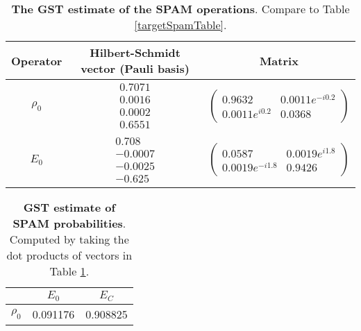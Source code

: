 {\begin{table}[h]
\begin{center}
\begin{tabular}[l]{|c|c|c|}
\hline
Operator & Hilbert-Schmidt vector (Pauli basis) & Matrix \\ \hline
$\rho_{0}$ & $ \begin{array}{c}
0.7071 \\ 
0.0016 \\ 
0.0002 \\ 
0.6551
 \end{array} $
 & $ \left(\!\!\begin{array}{cc}
0.9632 & 0.0011e^{-i0.2} \\ 
0.0011e^{i0.2} & 0.0368
 \end{array}\!\!\right) $
 \\ \hline
$E_{0}$ & $ \begin{array}{c}
0.708 \\ 
-0.0007 \\ 
-0.0025 \\ 
-0.625
 \end{array} $
 & $ \left(\!\!\begin{array}{cc}
0.0587 & 0.0019e^{i1.8} \\ 
0.0019e^{-i1.8} & 0.9426
 \end{array}\!\!\right) $
 \\ \hline
\end{tabular}

\caption{\textbf{The GST estimate of the SPAM operations}.  Compare to Table \ref{targetSpamTable}.\label{bestCPTPGatesetSpamTable}}
\end{center}
\end{table}

\begin{table}[h]
\begin{center}
\begin{tabular}[l]{|c|c|c|}
\hline
 & $E_{0}$ & $E_C$ \\ \hline
$\rho_{0}$ & 0.091176 & 0.908825 \\ \hline
\end{tabular}

\caption{\textbf{GST estimate of SPAM probabilities}.  Computed by taking the dot products of vectors in Table \ref{bestCPTPGatesetSpamTable}.\label{bestCPTPGatesetSpamParametersTable}}
\end{center}
\end{table}

}
